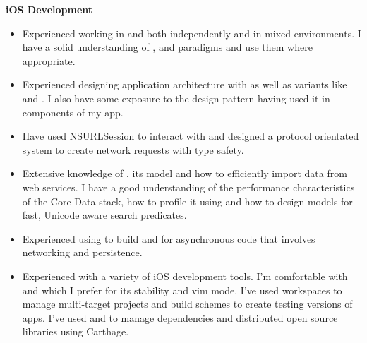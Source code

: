 \textbf{iOS Development}
\begin{itemize}[leftmargin=0mm]
\item Experienced working in  and  both
  independently and in mixed environments. I have a solid understanding of
  ,  and  paradigms and use them where appropriate.
\item Experienced designing application architecture with  as well as
  variants like  and . I also have some exposure to
  the  design pattern having used it in components of my app.
\item Have used NSURLSession to interact with  and
  designed a protocol orientated system to create network requests with type
  safety.
\item Extensive knowledge of , its  model
  and how to efficiently import data from web services. I have a good
  understanding of the performance characteristics of the Core Data stack, how
  to profile it using  and how to design models for fast,
  Unicode aware search predicates.
\item Experienced using  to build  and
   for asynchronous code that involves networking and
  persistence.
\item Experienced with a variety of iOS development tools. I'm comfortable with
   and  which I prefer for its stability and vim
  mode. I've used workspaces to manage multi-target projects and build schemes
  to create testing versions of apps. I've used  and
   to manage dependencies and distributed open source libraries
  using Carthage.
\end{itemize}

